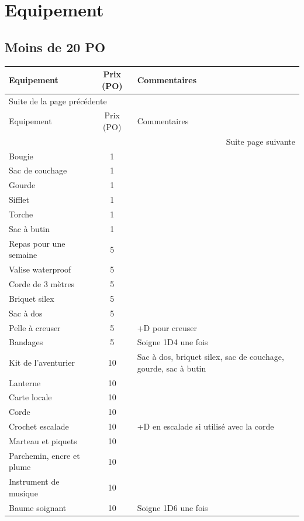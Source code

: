 \documentclass[a4paper, 11pt, twoside]{article}
\begin{document}
\newpage

\section{Equipement}
\label{sec:orgab2a15a}

\subsection{Moins de 20 PO}
\label{sec:org599b752}

\begin{longtable}{l|c|p{10cm}}
Equipement & Prix (PO) & Commentaires\\
\hline
\endfirsthead
\multicolumn{3}{l}{Suite de la page précédente} \\
\hline

Equipement & Prix (PO) & Commentaires \\

\hline
\endhead
\hline\multicolumn{3}{r}{Suite page suivante} \\
\endfoot
\endlastfoot
\hline
Bougie & 1 & \\
Sac de couchage & 1 & \\
Gourde & 1 & \\
Sifflet & 1 & \\
Torche & 1 & \\
Sac à butin & 1 & \\
Repas pour une semaine & 5 & \\
Valise waterproof & 5 & \\
Corde de 3 mètres & 5 & \\
Briquet silex & 5 & \\
Sac à dos & 5 & \\
Pelle à creuser & 5 & +D pour creuser\\
Bandages & 5 & Soigne 1D4 une fois\\
Kit de l'aventurier & 10 & Sac à dos, briquet silex, sac de couchage, gourde, sac à butin\\
Lanterne & 10 & \\
Carte locale & 10 & \\
Corde & 10 & \\
Crochet escalade & 10 & +D en escalade si utilisé avec la corde\\
Marteau et piquets & 10 & \\
Parchemin, encre et plume & 10 & \\
Instrument de musique & 10 & \\
Baume soignant & 10 & Soigne 1D6 une fois\\
\end{longtable}
\end{document}
